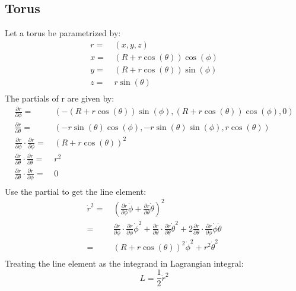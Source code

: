 \subsection{Torus}
Let a torus be parametrized by:
\begin{equation*}
\begin{aligned}
	r =&\,(x,y,z) \\
	x =&\, (R+r\cos(\theta))\cos(\phi)\\
	y =&\, (R+r\cos(\theta))\sin(\phi)\\
	z =&\, r\sin(\theta) \\
\end{aligned}
\end{equation*}
The partials of r are given by:
\begin{equation*}
\begin{aligned}
	\frac{\partial r}{\partial \phi} =&\, (-(R+r\cos(\theta))\sin(\phi),(R+r\cos(\theta))\cos(\phi),0) \\
	\frac{\partial r}{\partial \theta} =&\, (-r\sin(\theta)\cos(\phi),-r\sin(\theta)\sin(\phi),r\cos(\theta)) \\
	\frac{\partial r}{\partial \phi}\cdot\frac{\partial r}{\partial \phi} =&\, (R+r\cos(\theta))^2 \\
	\frac{\partial r}{\partial \theta}\cdot\frac{\partial r}{\partial \theta} =&\, r^2 \\
	\frac{\partial r}{\partial \theta}\cdot\frac{\partial r}{\partial \phi} =&\, 0 \\
\end{aligned}
\end{equation*}
Use the partial to get the line element:
\begin{equation*}
\begin{aligned}
	\dot{r}^2 =&\, \left(\frac{\partial r}{\partial \phi}\dot{\phi} + \frac{\partial r}{\partial \theta}\dot{\theta}\right)^2 \\
	=&\, \frac{\partial r}{\partial \phi}\cdot\frac{\partial r}{\partial \phi}\dot{\phi}^2+ \frac{\partial r}{\partial \theta}\cdot\frac{\partial r}{\partial \theta}\dot{\theta}^2+2\frac{\partial r}{\partial \theta}\cdot\frac{\partial r}{\partial \phi} \dot{\phi}\dot{\theta} \\
	=&\, (R+r\cos(\theta))^2\dot{\phi}^2+ r^2\dot{\theta}^2\\
\end{aligned}
\end{equation*}
Treating the line element as the integrand in Lagrangian integral:
\[ L = \frac{1}{2}\dot{r}^2\]
